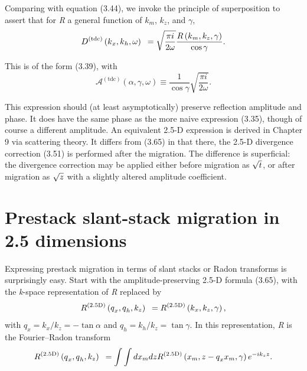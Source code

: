 Comparing with equation (3.44), we invoke the principle of superposition to assert that for \textit{R} a general function of \(k_m\), \(k_z\), and $\gamma$,
\begin{equation}\text{\textit{$D$}}^{(\text{{tdc}})}\left(\text{\textit{$k$}}_{\text{\textit{$x$}}},\text{\textit{$k$}}_{\text{\textit{$h$}}},\omega
\right)\text{  }=\sqrt{\frac{\pi  i \text{\textit{$ $}}}{2\omega  }}\frac{\text{\textit{$R$}}\left(\text{\textit{$k$}}_{\text{\textit{$m$}}},\text{\textit{$k_z$}}\text{\textit{$,$}}\, \gamma
\right)}{\cos  \gamma }.\end{equation}

This is of the form (3.39), with
\begin{equation} \mathcal{A}^{(\text{{tdc}})}(\alpha ,\gamma ,\omega ) \equiv \frac{1}{\cos  \gamma }\sqrt{\frac{\pi  i}{2\omega  }}.\end{equation}

This expression should (at least asymptotically) preserve reflection amplitude and phase. It does have the same phase as the more naive expression
(3.35), though of course a different amplitude. An equivalent 2.5-D expression is derived in \nobreak Chapter 9 via scattering theory. It differs from
(3.65) in that there, the 2.5-D divergence correction (3.51) is performed after the migration. The difference is superficial: the divergence
correction may be applied either before migration as \(\sqrt{\text{\textit{$t$}}}\), or after migration as \(\sqrt{\text{\textit{$z$}}}\) with
a slightly altered amplitude coefficient.

\section{Prestack slant-stack migration in 2.5 dimensions}

Expressing prestack migration in terms of slant stacks or Radon
transforms is surprisingly easy. Start with
the amplitude-preserving 2.5-D formula (3.65), with the
\textit{k}-space representation of \textit{R} replaced by
\begin{equation}\text{\textit{$R$}}^{(2.5\text{D})}\left(\text{\textit{$q$}}_{\text{\textit{$x$}}},\text{\textit{$q$}}_{\text{\textit{$h$}}},\text{\textit{$k_z$}}\right)\text{
 }= \text{\textit{$R$}}^{(2.5\text{D})}\left(\text{\textit{$k$}}_{\text{\textit{$x$}}},\text{\textit{$k_z$}}\text{\textit{$,$}}\, \gamma \right),\end{equation}
with \(q_x=k_x/k_z=-\tan  \alpha \) and \(q_h=k_h/k_z=\tan  \gamma \). In this representation, \textit{R} is the Fourier--Radon transform
\begin{equation}\text{\textit{$R$}}^{(2.5\text{D})}\left(\text{\textit{$q$}}_{\text{\textit{$x$}}},\text{\textit{$q$}}_{\text{\textit{$h$}}},\text{\textit{$k_z$}}\right)\text{
 }= \int \int d\text{\textit{$x_m$}}d\text{\textit{$z$}}\text{\textit{$ $}}\text{\textit{$R$}}^{(2.5\text{D})}\left(\text{\textit{$x_m$}},\text{\textit{$z$}}-\text{\textit{$q$}}_{\text{\textit{$x$}}}\text{\textit{$x_m$}}\text{\textit{$,$}}\, \gamma
\right)e^{-i \text{\textit{$k_z$}}\text{\textit{$z$}}} .\end{equation}

